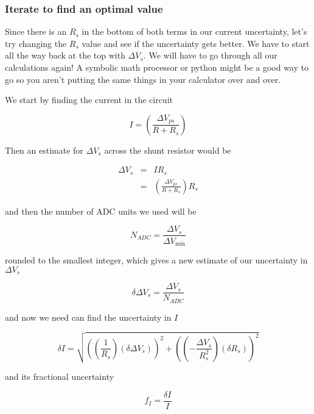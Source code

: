 \subsubsection{Iterate to find an optimal value}

Since there is an $R_{s}$ in the bottom of both terms in our current uncertainty, let's try changing the $R_{s}$ value and see if the uncertainty gets better. We have to start all the way back at the top with $\Delta V_{s}. $ We will have to go through all our calculations again! A symbolic math processor or python might be a good way to go so you aren't putting the same things in your calculator over and over.

We start by finding the current in the circuit

\begin{equation*}
	I=\left( \frac{\Delta V_{ps}}{R+R_{s}}\right)
\end{equation*}

\noindent Then an estimate for $\Delta V_{s}$ across the shunt resistor would be

\begin{eqnarray*}
	\Delta V_{s} &=&IR_{s} \\ &=&\left( \frac{\Delta V_{ps}}{R+R_{s}}\right) R_{s}
\end{eqnarray*}

\noindent and then the number of ADC units we used will be 

\begin{equation*}
	N_{ADC}=\frac{\Delta V_{s}}{\Delta V_{\min }}
\end{equation*}

\noindent rounded to the smallest integer, which gives a new estimate of our uncertainty in $\Delta V_{s}$ 

\begin{equation*}
	\delta \Delta V_{s}=\frac{\Delta V_{s}}{N_{ADC}}
\end{equation*}

\noindent and now we need can find the uncertainty in $I$

\begin{equation*}
	\delta I=\sqrt{\left( \left( \frac{1}{R_{s}}\right) \left( \delta \Delta V_{s}\right) \right) ^{2}+\left( \left( -\frac{\Delta V_{s}}{R_{s}^{2}} \right) \left( \delta R_{s}\right) \right) ^{2}}
\end{equation*}

\noindent and its fractional uncertainty

\begin{equation*}
	f_{I}=\frac{\delta I}{I}
\end{equation*}

